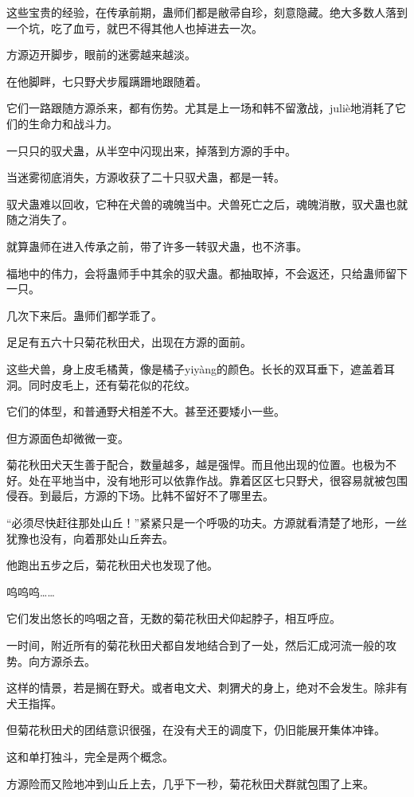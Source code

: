 \begin{this_body}
这些宝贵的经验，在传承前期，蛊师们都是敝帚自珍，刻意隐藏。绝大多数人落到一个坑，吃了血亏，就巴不得其他人也掉进去一次。

方源迈开脚步，眼前的迷雾越来越淡。

在他脚畔，七只野犬步履蹒跚地跟随着。

它们一路跟随方源杀来，都有伤势。尤其是上一场和韩不留激战，juliè地消耗了它们的生命力和战斗力。

一只只的驭犬蛊，从半空中闪现出来，掉落到方源的手中。

当迷雾彻底消失，方源收获了二十只驭犬蛊，都是一转。

驭犬蛊难以回收，它种在犬兽的魂魄当中。犬兽死亡之后，魂魄消散，驭犬蛊也就随之消失了。

就算蛊师在进入传承之前，带了许多一转驭犬蛊，也不济事。

福地中的伟力，会将蛊师手中其余的驭犬蛊。都抽取掉，不会返还，只给蛊师留下一只。

几次下来后。蛊师们都学乖了。

足足有五六十只菊花秋田犬，出现在方源的面前。

这些犬兽，身上皮毛橘黄，像是橘子yiyàng的颜色。长长的双耳垂下，遮盖着耳洞。同时皮毛上，还有菊花似的花纹。

它们的体型，和普通野犬相差不大。甚至还要矮小一些。

但方源面色却微微一变。

菊花秋田犬天生善于配合，数量越多，越是强悍。而且他出现的位置。也极为不好。处在平地当中，没有地形可以依靠作战。靠着区区七只野犬，很容易就被包围侵吞。到最后，方源的下场。比韩不留好不了哪里去。

“必须尽快赶往那处山丘！”紧紧只是一个呼吸的功夫。方源就看清楚了地形，一丝犹豫也没有，向着那处山丘奔去。

他跑出五步之后，菊花秋田犬也发现了他。

呜呜呜……

它们发出悠长的呜咽之音，无数的菊花秋田犬仰起脖子，相互呼应。

一时间，附近所有的菊花秋田犬都自发地结合到了一处，然后汇成河流一般的攻势。向方源杀去。

这样的情景，若是搁在野犬。或者电文犬、刺猬犬的身上，绝对不会发生。除非有犬王指挥。

但菊花秋田犬的团结意识很强，在没有犬王的调度下，仍旧能展开集体冲锋。

这和单打独斗，完全是两个概念。

方源险而又险地冲到山丘上去，几乎下一秒，菊花秋田犬群就包围了上来。


\end{this_body}
